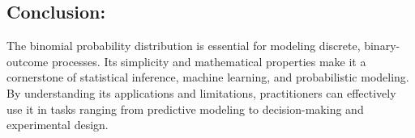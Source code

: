 \subsection*{Conclusion:}
The binomial probability distribution is essential for modeling discrete, binary-outcome processes. Its simplicity and mathematical properties make it a cornerstone of statistical inference, machine learning, and probabilistic modeling. By understanding its applications and limitations, practitioners can effectively use it in tasks ranging from predictive modeling to decision-making and experimental design.
